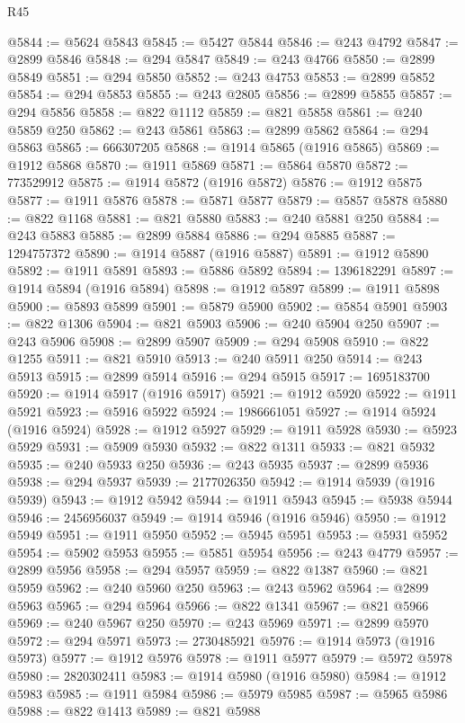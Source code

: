 \begin{lexlean}{R45}
\begin{coremodule}
{@5844 := @5624 @5843
@5845 := @5427 @5844
@5846 := @243 @4792
@5847 := @2899 @5846
@5848 := @294 @5847
@5849 := @243 @4766
@5850 := @2899 @5849
@5851 := @294 @5850
@5852 := @243 @4753
@5853 := @2899 @5852
@5854 := @294 @5853
@5855 := @243 @2805
@5856 := @2899 @5855
@5857 := @294 @5856
@5858 := @822 @1112
@5859 := @821 @5858
@5861 := @240 @5859 @250
@5862 := @243 @5861
@5863 := @2899 @5862
@5864 := @294 @5863
@5865 := 666307205
@5868 := @1914 @5865 (@1916 @5865)
@5869 := @1912 @5868
@5870 := @1911 @5869
@5871 := @5864 @5870
@5872 := 773529912
@5875 := @1914 @5872 (@1916 @5872)
@5876 := @1912 @5875
@5877 := @1911 @5876
@5878 := @5871 @5877
@5879 := @5857 @5878
@5880 := @822 @1168
@5881 := @821 @5880
@5883 := @240 @5881 @250
@5884 := @243 @5883
@5885 := @2899 @5884
@5886 := @294 @5885
@5887 := 1294757372
@5890 := @1914 @5887 (@1916 @5887)
@5891 := @1912 @5890
@5892 := @1911 @5891
@5893 := @5886 @5892
@5894 := 1396182291
@5897 := @1914 @5894 (@1916 @5894)
@5898 := @1912 @5897
@5899 := @1911 @5898
@5900 := @5893 @5899
@5901 := @5879 @5900
@5902 := @5854 @5901
@5903 := @822 @1306
@5904 := @821 @5903
@5906 := @240 @5904 @250
@5907 := @243 @5906
@5908 := @2899 @5907
@5909 := @294 @5908
@5910 := @822 @1255
@5911 := @821 @5910
@5913 := @240 @5911 @250
@5914 := @243 @5913
@5915 := @2899 @5914
@5916 := @294 @5915
@5917 := 1695183700
@5920 := @1914 @5917 (@1916 @5917)
@5921 := @1912 @5920
@5922 := @1911 @5921
@5923 := @5916 @5922
@5924 := 1986661051
@5927 := @1914 @5924 (@1916 @5924)
@5928 := @1912 @5927
@5929 := @1911 @5928
@5930 := @5923 @5929
@5931 := @5909 @5930
@5932 := @822 @1311
@5933 := @821 @5932
@5935 := @240 @5933 @250
@5936 := @243 @5935
@5937 := @2899 @5936
@5938 := @294 @5937
@5939 := 2177026350
@5942 := @1914 @5939 (@1916 @5939)
@5943 := @1912 @5942
@5944 := @1911 @5943
@5945 := @5938 @5944
@5946 := 2456956037
@5949 := @1914 @5946 (@1916 @5946)
@5950 := @1912 @5949
@5951 := @1911 @5950
@5952 := @5945 @5951
@5953 := @5931 @5952
@5954 := @5902 @5953
@5955 := @5851 @5954
@5956 := @243 @4779
@5957 := @2899 @5956
@5958 := @294 @5957
@5959 := @822 @1387
@5960 := @821 @5959
@5962 := @240 @5960 @250
@5963 := @243 @5962
@5964 := @2899 @5963
@5965 := @294 @5964
@5966 := @822 @1341
@5967 := @821 @5966
@5969 := @240 @5967 @250
@5970 := @243 @5969
@5971 := @2899 @5970
@5972 := @294 @5971
@5973 := 2730485921
@5976 := @1914 @5973 (@1916 @5973)
@5977 := @1912 @5976
@5978 := @1911 @5977
@5979 := @5972 @5978
@5980 := 2820302411
@5983 := @1914 @5980 (@1916 @5980)
@5984 := @1912 @5983
@5985 := @1911 @5984
@5986 := @5979 @5985
@5987 := @5965 @5986
@5988 := @822 @1413
@5989 := @821 @5988
}
\end{coremodule}
\end{lexlean}
